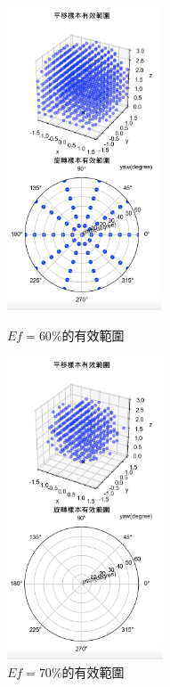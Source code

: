 \begin{figure}[htpb]
    \centering
    \begin{minipage}{.5\textwidth}
        \centering
        \includegraphics[height = 9cm]{ch4pic/ef60.png}
        \caption{$Ef=60\%$的有效範圍}
        \label{pic:ef60}
    \end{minipage}%
    \begin{minipage}{0.5\textwidth}
        \centering
        \includegraphics[height = 9cm]{ch4pic/ef70.png}
        \caption{$Ef=70\%$的有效範圍}
        \label{pic:ef70}
    \end{minipage}
\end{figure}


